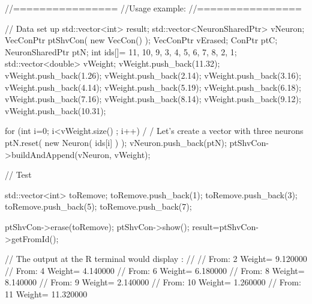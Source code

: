 \begin{DoxyCode}
        //================
        //Usage example:
        //================

        // Data set up
                        std::vector<int> result;
                        std::vector<NeuronSharedPtr> vNeuron;
                        VecConPtr ptShvCon( new VecCon() );
                        VecConPtr vErased;
                        ConPtr    ptC;
                        NeuronSharedPtr ptN;
                        int ids[]= {11, 10, 9, 3, 4, 5, 6, 7, 8, 2, 1};
                        std::vector<double> vWeight;
                        vWeight.push_back(11.32);
                        vWeight.push_back(1.26);
                        vWeight.push_back(2.14);
                        vWeight.push_back(3.16);
                        vWeight.push_back(4.14);
                        vWeight.push_back(5.19);
                        vWeight.push_back(6.18);
                        vWeight.push_back(7.16);
                        vWeight.push_back(8.14);
                        vWeight.push_back(9.12);
                        vWeight.push_back(10.31);

                        for (int i=0; i<vWeight.size() ; i++) {                         /
      / Let's create a vector with three neurons
                                ptN.reset( new Neuron( ids[i] ) );
                                vNeuron.push_back(ptN);
                        }
                        ptShvCon->buildAndAppend(vNeuron, vWeight);

                        // Test

                        std::vector<int> toRemove;
                        toRemove.push_back(1);
                        toRemove.push_back(3);
                        toRemove.push_back(5);
                        toRemove.push_back(7);

                        ptShvCon->erase(toRemove);
                        ptShvCon->show();
                        result=ptShvCon->getFromId();

                // The output at the R terminal would display :
                //
                // From:         2       Weight=         9.120000
                // From:         4       Weight=         4.140000
                // From:         6       Weight=         6.180000
                // From:         8       Weight=         8.140000
                // From:         9       Weight=         2.140000
                // From:         10  Weight=     1.260000
                // From:         11  Weight=     11.320000
\end{DoxyCode}


